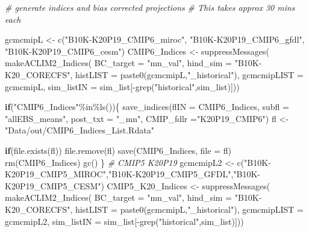 \documentclass[
]{article}
\newenvironment{Shaded}{\begin{snugshade}}{\end{snugshade}}
\newcommand{\AttributeTok}[1]{\textcolor[rgb]{0.77,0.63,0.00}{#1}}
\newcommand{\CommentTok}[1]{\textcolor[rgb]{0.56,0.35,0.01}{\textit{#1}}}
\newcommand{\ControlFlowTok}[1]{\textcolor[rgb]{0.13,0.29,0.53}{\textbf{#1}}}
\newcommand{\FunctionTok}[1]{\textcolor[rgb]{0.00,0.00,0.00}{#1}}
\newcommand{\NormalTok}[1]{#1}
\newcommand{\OtherTok}[1]{\textcolor[rgb]{0.56,0.35,0.01}{#1}}
\newcommand{\SpecialCharTok}[1]{\textcolor[rgb]{0.00,0.00,0.00}{#1}}
\newcommand{\StringTok}[1]{\textcolor[rgb]{0.31,0.60,0.02}{#1}}
\begin{document}
\begin{Shaded}
\begin{Highlighting}[]
    
    \CommentTok{\# generate indices and bias corrected projections }
    \CommentTok{\# This takes approx 30 mins each}
    
\NormalTok{    gcmcmipL }\OtherTok{\textless{}{-}} \FunctionTok{c}\NormalTok{(}\StringTok{"B10K{-}K20P19\_CMIP6\_miroc"}\NormalTok{,}
                  \StringTok{"B10K{-}K20P19\_CMIP6\_gfdl"}\NormalTok{,}
                  \StringTok{"B10K{-}K20P19\_CMIP6\_cesm"}\NormalTok{) }
\NormalTok{    CMIP6\_Indices }\OtherTok{\textless{}{-}} \FunctionTok{suppressMessages}\NormalTok{(}
                        \FunctionTok{makeACLIM2\_Indices}\NormalTok{(}
                        \AttributeTok{BC\_target =} \StringTok{"mn\_val"}\NormalTok{,}
                        \AttributeTok{hind\_sim  =}  \StringTok{"B10K{-}K20\_CORECFS"}\NormalTok{,}
                        \AttributeTok{histLIST  =} \FunctionTok{paste0}\NormalTok{(gcmcmipL,}\StringTok{"\_historical"}\NormalTok{),}
                        \AttributeTok{gcmcmipLIST =}\NormalTok{ gcmcmipL,}
                        \AttributeTok{sim\_listIN =}\NormalTok{ sim\_list[}\SpecialCharTok{{-}}\FunctionTok{grep}\NormalTok{(}\StringTok{"historical"}\NormalTok{,sim\_list)]))}
    
     \ControlFlowTok{if}\NormalTok{(}\StringTok{"CMIP6\_Indices"}\SpecialCharTok{\%in\%}\FunctionTok{ls}\NormalTok{())\{                 }
      \FunctionTok{save\_indices}\NormalTok{(}\AttributeTok{flIN =}\NormalTok{ CMIP6\_Indices, }
                   \AttributeTok{subfl =} \StringTok{"allEBS\_means"}\NormalTok{,}
                   \AttributeTok{post\_txt =} \StringTok{"\_mn"}\NormalTok{,}
                   \AttributeTok{CMIP\_fdlr =}\StringTok{"K20P19\_CMIP6"}\NormalTok{)}
\NormalTok{      fl }\OtherTok{\textless{}{-}} \StringTok{"Data/out/CMIP6\_Indices\_List.Rdata"}
      
      \ControlFlowTok{if}\NormalTok{(}\FunctionTok{file.exists}\NormalTok{(fl)) }\FunctionTok{file.remove}\NormalTok{(fl)}
      \FunctionTok{save}\NormalTok{(CMIP6\_Indices, }\AttributeTok{file =}\NormalTok{ fl)}
      \FunctionTok{rm}\NormalTok{(CMIP6\_Indices)}
      \FunctionTok{gc}\NormalTok{()}
\NormalTok{     \}}
    \CommentTok{\# CMIP5 K20P19}
\NormalTok{    gcmcmipL2 }\OtherTok{\textless{}{-}} \FunctionTok{c}\NormalTok{(}\StringTok{"B10K{-}K20P19\_CMIP5\_MIROC"}\NormalTok{,}\StringTok{"B10K{-}K20P19\_CMIP5\_GFDL"}\NormalTok{,}\StringTok{"B10K{-}K20P19\_CMIP5\_CESM"}\NormalTok{) }
\NormalTok{    CMIP5\_K20\_Indices }\OtherTok{\textless{}{-}} \FunctionTok{suppressMessages}\NormalTok{(}
                        \FunctionTok{makeACLIM2\_Indices}\NormalTok{(}
                        \AttributeTok{BC\_target =} \StringTok{"mn\_val"}\NormalTok{,}
                        \AttributeTok{hind\_sim  =}  \StringTok{"B10K{-}K20\_CORECFS"}\NormalTok{,}
                        \AttributeTok{histLIST  =} \FunctionTok{paste0}\NormalTok{(gcmcmipL,}\StringTok{"\_historical"}\NormalTok{),}
                        \AttributeTok{gcmcmipLIST =}\NormalTok{ gcmcmipL2,}
                        \AttributeTok{sim\_listIN =}\NormalTok{ sim\_list[}\SpecialCharTok{{-}}\FunctionTok{grep}\NormalTok{(}\StringTok{"historical"}\NormalTok{,sim\_list)]))}
    

\end{Highlighting}
\end{Shaded}
\end{document}
